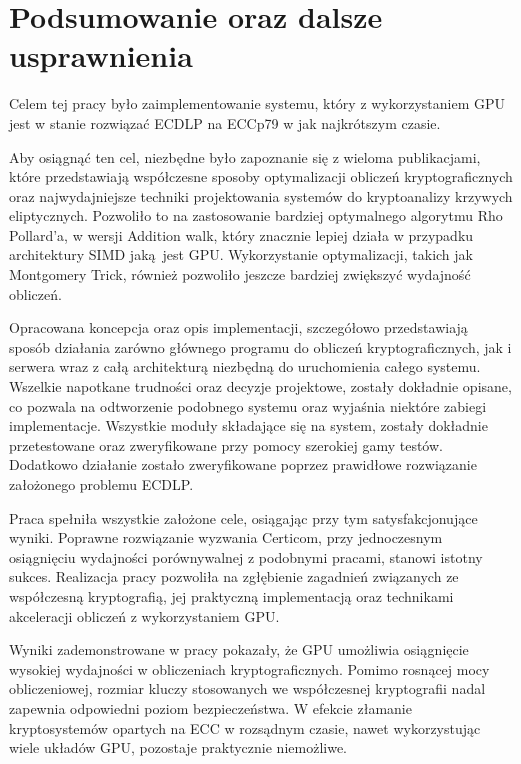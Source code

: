 \newpage  
\section{Podsumowanie oraz dalsze usprawnienia}  
Celem tej pracy było zaimplementowanie systemu,
który z wykorzystaniem GPU jest w stanie rozwiązać ECDLP na ECCp79 w jak najkrótszym czasie.
\par
Aby osiągnąć ten cel, niezbędne było zapoznanie się z wieloma publikacjami, które
przedstawiają współczesne sposoby optymalizacji obliczeń kryptograficznych oraz
najwydajniejsze techniki projektowania systemów do kryptoanalizy krzywych eliptycznych.
Pozwoliło to na zastosowanie bardziej optymalnego algorytmu Rho Pollard'a, w wersji Addition walk,
który znacznie lepiej działa w przypadku architektury SIMD jaką jest GPU.
Wykorzystanie optymalizacji, takich jak Montgomery Trick, również pozwoliło
jeszcze bardziej zwiększyć wydajność obliczeń.

Opracowana koncepcja oraz opis implementacji, szczegółowo przedstawiają sposób
działania zarówno głównego programu do obliczeń kryptograficznych, jak i serwera
wraz z całą architekturą niezbędną do uruchomienia całego systemu.
Wszelkie napotkane trudności oraz decyzje projektowe, zostały dokładnie opisane,
co pozwala na odtworzenie podobnego systemu oraz wyjaśnia niektóre zabiegi implementacje.
Wszystkie moduły składające się na system, zostały dokładnie przetestowane oraz zweryfikowane przy
pomocy szerokiej gamy testów. Dodatkowo działanie zostało zweryfikowane
poprzez prawidłowe rozwiązanie założonego problemu ECDLP.

Praca spełniła wszystkie założone cele, osiągając przy tym satysfakcjonujące wyniki.
Poprawne rozwiązanie wyzwania Certicom, przy jednoczesnym osiągnięciu wydajności porównywalnej z  
podobnymi pracami, stanowi istotny sukces.
Realizacja pracy pozwoliła na zgłębienie zagadnień związanych ze współczesną  
kryptografią, jej praktyczną implementacją oraz technikami  
akceleracji obliczeń z wykorzystaniem GPU.  

Wyniki zademonstrowane w pracy pokazały, że GPU umożliwia osiągnięcie
wysokiej wydajności w obliczeniach kryptograficznych.
Pomimo rosnącej mocy obliczeniowej,
rozmiar kluczy stosowanych we współczesnej kryptografii nadal zapewnia
odpowiedni poziom bezpieczeństwa. W efekcie złamanie kryptosystemów opartych na
ECC w rozsądnym czasie, nawet wykorzystując wiele układów GPU, pozostaje praktycznie niemożliwe.

